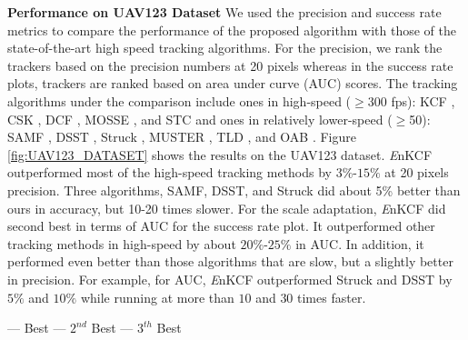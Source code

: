 \documentclass[10pt,twocolumn,letterpaper]{article}
\begin{document}
\textbf{Performance on UAV123 Dataset} We used the precision and
success rate metrics to compare the performance of the proposed
algorithm with those of the state-of-the-art high speed tracking
algorithms. For the precision, we rank the trackers based on the
precision numbers at 20 pixels whereas in the success rate plots,
trackers are ranked based on area under curve (AUC) scores. The
tracking algorithms under the comparison include ones in high-speed
($\geq$300 fps): KCF \cite{henriques2015high}, CSK
\cite{henriques2012exploiting}, DCF \cite{henriques2015high},
MOSSE \cite{bolme2010visual,henriques2015high}, and STC \cite{zhang2014fast} and ones in relatively
lower-speed ($\geq$50): SAMF \cite{li2014scale}, DSST
\cite{danelljan2014accurate}, Struck \cite{hare2012efficient}, MUSTER
\cite{hong2015multi}, TLD \cite{kalal2012tracking}, and OAB
\cite{zhang2012robust}. Figure \ref{fig:UAV123_DATASET} shows the
results on the UAV123 dataset. {\it E}nKCF outperformed most of the
high-speed tracking methods by $3\%$-$15\%$ at 20 pixels
precision. Three algorithms, SAMF, DSST, and Struck did about 5\%
better than ours in accuracy, but 10-20 times slower. For the scale
adaptation, {\it E}nKCF did second best in terms of AUC for the
success rate plot. It outperformed other tracking methods in
high-speed by about $20\%$-$25\%$ in AUC. In addition, it performed
even better than those algorithms that are slow, but a slightly better
in precision. For example, for AUC, {\it E}nKCF outperformed Struck
and DSST by $5\%$ and $10\%$ while running at more than $10$ and $30$
times faster.

\begin{table}[!h]
\smaller
\begin{center}
\color{green}--- Best \hspace{.15\linewidth}\color{red}--- $2^{nd}$ Best \hspace{.15\linewidth}\color{blue}--- $3^{th}$ Best \color{black}\\
\end{center}
\caption{Results of running different combinations of the KCFs for
  UAV123 dataset. This table empirically supported the usefulness of
  combining multiple KCFs as long as the deployment order is optimal.}
\label{table:Comparison_to_LCT}
\end{table}
\end{document}
